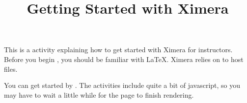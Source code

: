 \documentclass{ximera}
\title{Getting Started with Ximera}
\begin{document}
\maketitle

This is a  activity explaining how to get started with Ximera for instructors. 
Before you begin , you should be familiar with \LaTeX.
Ximera relies on  to host files.

You can get started by . The activities include quite a bit of javascript, so you may have to wait a little while for the page to finish rendering.
\end{document}
